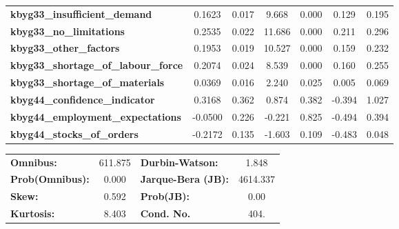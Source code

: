 \begin{center}
\begin{tabular}{lcccccc}
\textbf{kbyg33\_insufficient\_demand}        &       0.1623  &        0.017     &     9.668  &         0.000        &        0.129    &        0.195     \\
\textbf{kbyg33\_no\_limitations}             &       0.2535  &        0.022     &    11.686  &         0.000        &        0.211    &        0.296     \\
\textbf{kbyg33\_other\_factors}              &       0.1953  &        0.019     &    10.527  &         0.000        &        0.159    &        0.232     \\
\textbf{kbyg33\_shortage\_of\_labour\_force} &       0.2074  &        0.024     &     8.539  &         0.000        &        0.160    &        0.255     \\
\textbf{kbyg33\_shortage\_of\_materials}     &       0.0369  &        0.016     &     2.240  &         0.025        &        0.005    &        0.069     \\
\textbf{kbyg44\_confidence\_indicator}       &       0.3168  &        0.362     &     0.874  &         0.382        &       -0.394    &        1.027     \\
\textbf{kbyg44\_employment\_expectations}    &      -0.0500  &        0.226     &    -0.221  &         0.825        &       -0.494    &        0.394     \\
\textbf{kbyg44\_stocks\_of\_orders}          &      -0.2172  &        0.135     &    -1.603  &         0.109        &       -0.483    &        0.048     \\
\bottomrule
\end{tabular}
\begin{tabular}{lclc}
\textbf{Omnibus:}       & 611.875 & \textbf{  Durbin-Watson:     } &    1.848  \\
\textbf{Prob(Omnibus):} &   0.000 & \textbf{  Jarque-Bera (JB):  } & 4614.337  \\
\textbf{Skew:}          &   0.592 & \textbf{  Prob(JB):          } &     0.00  \\
\textbf{Kurtosis:}      &   8.403 & \textbf{  Cond. No.          } &     404.  \\
\bottomrule
\end{tabular}
\end{center}